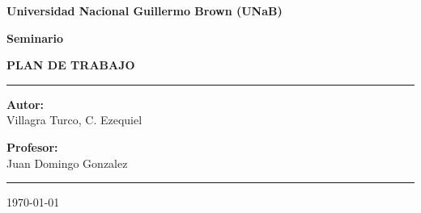 
\begin{titlepage}
    \vspace*{\fill}
    \begin{center}
        
        \LARGE \textbf{Universidad Nacional Guillermo Brown (UNaB)} \\
        \vspace{1.5cm} %
        
        {\large \textbf{Seminario}} \\
        \vspace{2cm} %
        
        {\Huge \textbf{PLAN DE TRABAJO}} \\
        \vspace{3cm} %
        
        \rule{\textwidth}{0.4pt} %
        
        
        \begin{minipage}[t]{0.4\textwidth} %
            \begin{flushleft} %
                \large
                \textbf{Autor:} \\
                Villagra Turco, C. Ezequiel
            \end{flushleft}
        \end{minipage}
        \hfill %
        \begin{minipage}[t]{0.48\textwidth} %
            \begin{flushright} %
                \large
                \textbf{Profesor:} \\
                Juan Domingo Gonzalez
            \end{flushright}
        \end{minipage}
        
        \vspace{0.5cm} %
        \rule{\textwidth}{0.4pt} %
        \vspace{2cm} %
        
        {\large \today} %
        
    \end{center}
    \vspace*{\fill}
\end{titlepage}

\newpage